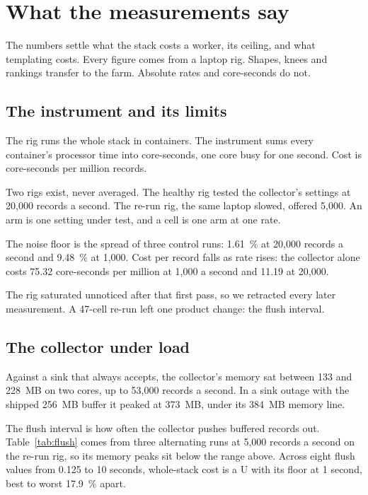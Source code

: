 \section{What the measurements say}\label{sec:eval}

The numbers settle what the stack costs a worker, its ceiling, and what templating costs. Every figure comes from a laptop rig. Shapes, knees and rankings transfer to the farm. Absolute rates and core-seconds do not.

\subsection{The instrument and its limits}\label{sec:eval-instrument}

The rig runs the whole stack in containers. The instrument sums every container's processor time into core-seconds, one core busy for one second. Cost is core-seconds per million records.

Two rigs exist, never averaged. The healthy rig tested the collector's settings at 20,000 records a second. The re-run rig, the same laptop slowed, offered 5,000. An arm is one setting under test, and a cell is one arm at one rate.

The noise floor is the spread of three control runs: 1.61~\% at 20,000 records a second and 9.48~\% at 1,000. Cost per record falls as rate rises: the collector alone costs 75.32 core-seconds per million at 1,000 a second and 11.19 at 20,000.

The rig saturated unnoticed after that first pass, so we retracted every later measurement. A 47-cell re-run left one product change: the flush interval.

\subsection{The collector under load}\label{sec:eval-collector}

Against a sink that always accepts, the collector's memory sat between 133 and 228~MB on two cores, up to 53,000 records a second. In a sink outage with the shipped 256~MB buffer it peaked at 373~MB, under its 384~MB memory line.

The flush interval is how often the collector pushes buffered records out. Table~\ref{tab:flush} comes from three alternating runs at 5,000 records a second on the re-run rig, so its memory peaks sit below the range above. Across eight flush values from 0.125 to 10 seconds, whole-stack cost is a U with its floor at 1 second, best to worst 17.9~\% apart.

